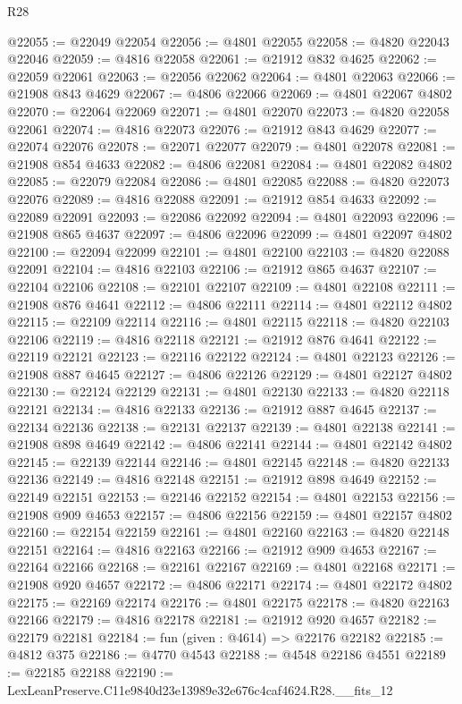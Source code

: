 \begin{lexlean}{R28}
\begin{coremodule}
@22055 := @22049 @22054
@22056 := @4801 @22055
@22058 := @4820 @22043 @22046
@22059 := @4816 @22058
@22061 := @21912 @832 @4625
@22062 := @22059 @22061
@22063 := @22056 @22062
@22064 := @4801 @22063
@22066 := @21908 @843 @4629
@22067 := @4806 @22066
@22069 := @4801 @22067 @4802
@22070 := @22064 @22069
@22071 := @4801 @22070
@22073 := @4820 @22058 @22061
@22074 := @4816 @22073
@22076 := @21912 @843 @4629
@22077 := @22074 @22076
@22078 := @22071 @22077
@22079 := @4801 @22078
@22081 := @21908 @854 @4633
@22082 := @4806 @22081
@22084 := @4801 @22082 @4802
@22085 := @22079 @22084
@22086 := @4801 @22085
@22088 := @4820 @22073 @22076
@22089 := @4816 @22088
@22091 := @21912 @854 @4633
@22092 := @22089 @22091
@22093 := @22086 @22092
@22094 := @4801 @22093
@22096 := @21908 @865 @4637
@22097 := @4806 @22096
@22099 := @4801 @22097 @4802
@22100 := @22094 @22099
@22101 := @4801 @22100
@22103 := @4820 @22088 @22091
@22104 := @4816 @22103
@22106 := @21912 @865 @4637
@22107 := @22104 @22106
@22108 := @22101 @22107
@22109 := @4801 @22108
@22111 := @21908 @876 @4641
@22112 := @4806 @22111
@22114 := @4801 @22112 @4802
@22115 := @22109 @22114
@22116 := @4801 @22115
@22118 := @4820 @22103 @22106
@22119 := @4816 @22118
@22121 := @21912 @876 @4641
@22122 := @22119 @22121
@22123 := @22116 @22122
@22124 := @4801 @22123
@22126 := @21908 @887 @4645
@22127 := @4806 @22126
@22129 := @4801 @22127 @4802
@22130 := @22124 @22129
@22131 := @4801 @22130
@22133 := @4820 @22118 @22121
@22134 := @4816 @22133
@22136 := @21912 @887 @4645
@22137 := @22134 @22136
@22138 := @22131 @22137
@22139 := @4801 @22138
@22141 := @21908 @898 @4649
@22142 := @4806 @22141
@22144 := @4801 @22142 @4802
@22145 := @22139 @22144
@22146 := @4801 @22145
@22148 := @4820 @22133 @22136
@22149 := @4816 @22148
@22151 := @21912 @898 @4649
@22152 := @22149 @22151
@22153 := @22146 @22152
@22154 := @4801 @22153
@22156 := @21908 @909 @4653
@22157 := @4806 @22156
@22159 := @4801 @22157 @4802
@22160 := @22154 @22159
@22161 := @4801 @22160
@22163 := @4820 @22148 @22151
@22164 := @4816 @22163
@22166 := @21912 @909 @4653
@22167 := @22164 @22166
@22168 := @22161 @22167
@22169 := @4801 @22168
@22171 := @21908 @920 @4657
@22172 := @4806 @22171
@22174 := @4801 @22172 @4802
@22175 := @22169 @22174
@22176 := @4801 @22175
@22178 := @4820 @22163 @22166
@22179 := @4816 @22178
@22181 := @21912 @920 @4657
@22182 := @22179 @22181
@22184 := fun (given : @4614) => @22176 @22182
@22185 := @4812 @375
@22186 := @4770 @4543
@22188 := @4548 @22186 @4551
@22189 := @22185 @22188
@22190 := LexLeanPreserve.C11e9840d23e13989e32e676c4caf4624.R28.__fits_12

\end{coremodule}
\end{lexlean}
